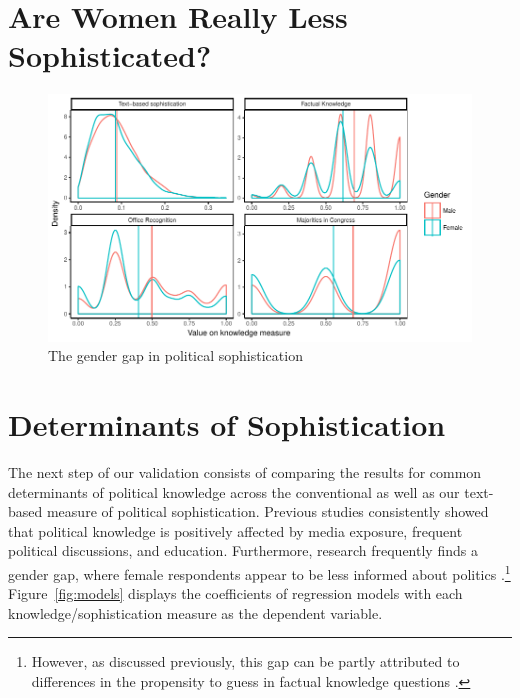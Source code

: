 \documentclass[12pt]{article}
\begin{document}
\section*{Are Women Really Less Sophisticated?}



\begin{figure}[h]\centering
\includegraphics{../fig/densities.pdf}
\caption{The gender gap in political sophistication}\label{fig:densities}
\end{figure}






\section*{Determinants of Sophistication}

The next step of our validation consists of comparing the results for common determinants of political knowledge across the conventional as well as our text-based measure of political sophistication. Previous studies consistently showed that political knowledge is positively affected by media exposure, frequent political discussions, and education. Furthermore, research frequently finds a gender gap, where female respondents appear to be less informed about politics \citep[c.f.][]{barabas2014question}.\footnote{However, as discussed previously, this gap can be partly attributed to differences in the propensity to guess in factual knowledge questions \citep[e.g.][]{mondak2004knowledge}.} Figure~\ref{fig:models} displays the coefficients of regression models with each knowledge/sophistication measure as the dependent variable.
\end{document}
